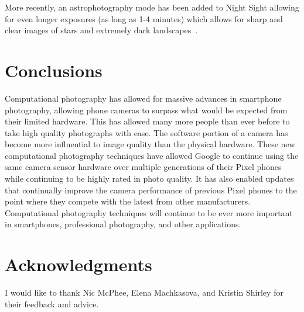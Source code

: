 \documentclass{sig-alternate}
\begin{document}
More recently, an astrophotography mode has been added to Night Sight allowing for even longer exposures (as long as 1-4 minutes) which allows for sharp and clear images of stars and extremely dark landscapes~\cite{blog:Kainz2019}.



\section{Conclusions}

Computational photography has allowed for massive advances in smartphone photography, allowing phone cameras to surpass what would be expected from their limited hardware. This has allowed many more people than ever before to take high quality photographs with ease. 
The software portion of a camera has become more influential to image quality than the physical hardware.
These new computational photography techniques have allowed Google to continue using the same camera sensor hardware over multiple generations of their Pixel phones while continuing to be highly rated in photo quality. It has also enabled updates that continually improve the camera performance of previous Pixel phones to the point where they compete with the latest from other manufacturers. 
Computational photography techniques will continue to be ever more important in smartphones, professional photography, and other applications.

\section*{Acknowledgments}

I would like to thank Nic McPhee, Elena Machkasova, and Kristin Shirley for their feedback and advice.

\label{sec:acknowledgments}

\pagebreak


  
\end{document}
